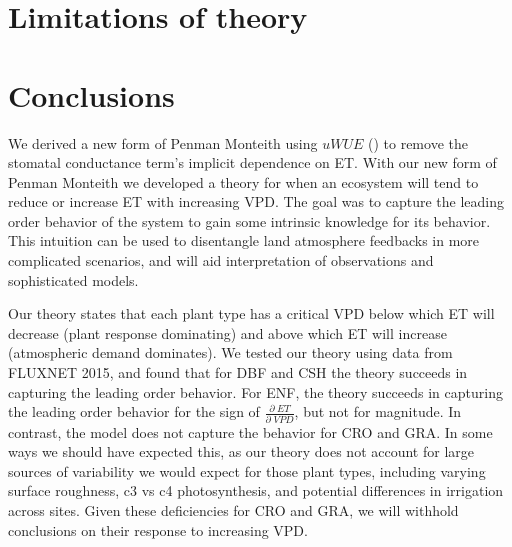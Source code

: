\documentclass[draft,linenumbers]{agujournal}
\begin{document}


\section{Limitations of theory}

\section{Conclusions} 

We derived a new form of Penman Monteith using $uWUE$ (\cite{Zhou_2015}) to remove the stomatal conductance term's implicit dependence on ET. With our new form of Penman Monteith we developed a theory for when an ecosystem will tend to reduce or increase ET with increasing VPD. The goal was to capture the leading order behavior of the system to gain some intrinsic knowledge for its behavior. This intuition can be used to disentangle land atmosphere feedbacks in more complicated scenarios, and will aid interpretation of observations and sophisticated models.

Our theory states that each plant type has a critical VPD below which ET will decrease (plant response dominating) and above which ET will increase (atmospheric demand dominates). We tested our theory using data from FLUXNET 2015, and found that for DBF and CSH the theory succeeds in capturing the leading order behavior. For ENF, the theory succeeds in capturing the leading order behavior for the sign of $\frac{\partial \; ET}{\partial \; VPD}$, but not for magnitude. In contrast, the model does not capture the behavior for CRO and GRA. In some ways we should have expected this, as our theory does not account for large sources of variability we would expect for those plant types, including varying surface roughness, c3 vs c4 photosynthesis, and potential differences in irrigation across sites. Given these deficiencies for CRO and GRA, we will withhold conclusions on their response to increasing VPD.
\end{document}
